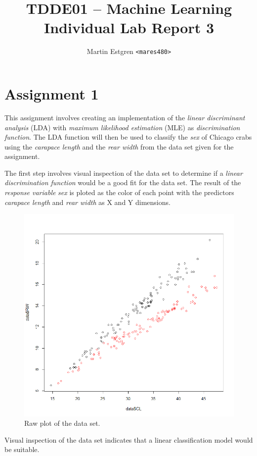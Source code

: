 \documentclass[a4paper,12pt]{article}
\title{TDDE01 -- Machine Learning \\
       Individual Lab Report 3}
\author{Martin Estgren \texttt{<mares480>}}
\begin{document}
    \maketitle %
\section{Assignment 1}

This assignment involves creating an implementation of the \textit{linear discriminant analysis} (LDA) with \textit{maximum likelihood estimation} (MLE) as \textit{discrimination function}. The LDA function will then be used to classify the \textit{sex} of Chicago crabs using the \textit{carapace length} and the \textit{rear width} from the data set given for the assignment.

The first step involves visual inspection of the data set to determine if a \textit{linear discrimination function} would be a good fit for the data set. The result of the \textit{response variable} \textit{sex} is ploted as the color of each point with the predictors \textit{carapace length} and \textit{rear width} as X and Y dimensions.

\begin{figure}[H]
\centering
\begin{minipage}[]{0.5\textwidth}
  \includegraphics[width=\textwidth]{figures/raw_plot.png}  
  \caption{Raw plot of the data set.\label{fig:raw_plot}}
 \end{minipage}
\end{figure}
Visual inspection of the data set indicates that a linear classification model would be suitable.
\end{document}

